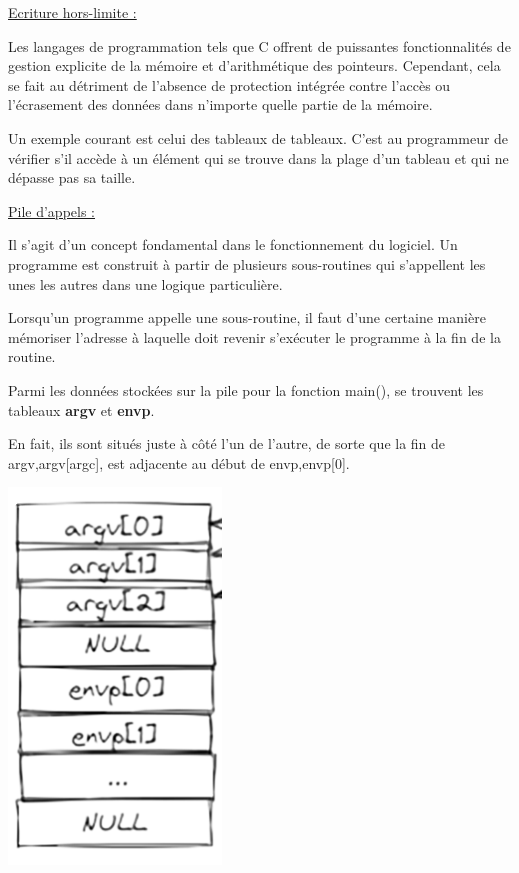 \documentclass[12pt,a4paper]{article}
\begin{document}
\begin{flushleft}
            \underline{Ecriture hors-limite : }
                \item Les langages de programmation tels que C offrent de puissantes fonctionnalités de gestion explicite de la mémoire et d’arithmétique des pointeurs. Cependant, cela se fait au détriment de l’absence de protection intégrée contre l’accès ou l’écrasement des données dans n’importe quelle partie de la mémoire.
                \item Un exemple courant est celui des tableaux de tableaux. C’est au programmeur de vérifier s’il accède à un élément qui se trouve dans la plage d’un tableau et qui ne dépasse pas sa taille.
            \item \underline{Pile d’appels :}
                \item Il s’agit d’un concept fondamental dans le fonctionnement du logiciel. Un programme est construit à partir de plusieurs sous-routines qui s’appellent les unes les autres dans une logique particulière.
                \item Lorsqu'un programme appelle une sous-routine, il faut d'une certaine manière mémoriser l'adresse à laquelle doit revenir s'exécuter le programme à la fin de la routine. 
                \item Parmi les données stockées sur la pile pour la fonction main(), se trouvent les tableaux \textbf{argv} et \textbf{envp}.
                \item En fait, ils sont situés juste à côté l’un de l’autre, de sorte que la fin de argv,argv[argc], est adjacente au début de envp,envp[0].
                \begin{center}
                    \includegraphics[scale=0.4]{pile_appel}

\end{center}
\end{flushleft}
\end{document}
